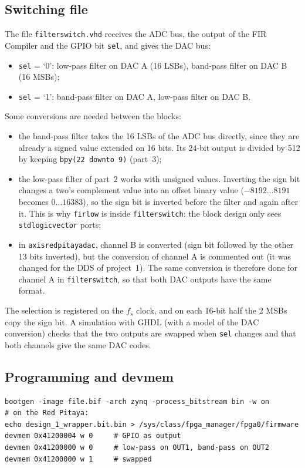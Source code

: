 \documentclass[11pt,a4paper]{article}
\renewcommand{\_}{\oldunderscore\allowbreak}
\begin{document}
\subsection{Switching file}
The file \texttt{filter\_switch.vhd} receives the ADC bus, the output of the
FIR Compiler and the GPIO bit \texttt{sel}, and gives the DAC bus:
\begin{itemize}
  \item \texttt{sel} = `0': low-pass filter on DAC A (16 LSBs), band-pass filter
        on DAC B (16 MSBs);
  \item \texttt{sel} = `1': band-pass filter on DAC A, low-pass filter on DAC B.
\end{itemize}
Some conversions are needed between the blocks:
\begin{itemize}
  \item the band-pass filter takes the 16 LSBs of the ADC bus directly, since
        they are already a signed value extended on 16 bits. Its 24-bit output
        is divided by 512 by keeping \texttt{bp\_y(22 downto 9)} (part~3);
  \item the low-pass filter of part~2 works with unsigned values. Inverting the
        sign bit changes a two's complement value into an offset binary value
        ($-8192 \ldots 8191$ becomes $0 \ldots 16383$), so the sign bit is
        inverted before the filter and again after it. This is why
        \texttt{fir\_low} is inside \texttt{filter\_switch}: the block design
        only sees \texttt{std\_logic\_vector} ports;
  \item in \texttt{axis\_red\_pitaya\_dac}, channel B is converted
        (sign bit followed by the other 13 bits inverted), but the conversion
        of channel A is commented out (it was changed for the DDS of
        project~1). The same conversion is therefore done for channel A in
        \texttt{filter\_switch}, so that both DAC outputs have the same format.
\end{itemize}
The selection is registered on the $f_s$ clock, and on each 16-bit half the
2 MSBs copy the sign bit. A simulation with GHDL (with a model of the DAC
conversion) checks that the two outputs are swapped when \texttt{sel} changes
and that both channels give the same DAC codes.



\subsection{Programming and devmem}
\begin{lstlisting}[style=sh, caption={Loading the bitstream and switching the filters}]
bootgen -image file.bif -arch zynq -process_bitstream bin -w on
# on the Red Pitaya:
echo design_1_wrapper.bit.bin > /sys/class/fpga_manager/fpga0/firmware
devmem 0x41200004 w 0     # GPIO as output
devmem 0x41200000 w 0     # low-pass on OUT1, band-pass on OUT2
devmem 0x41200000 w 1     # swapped
\end{lstlisting}
\end{document}
